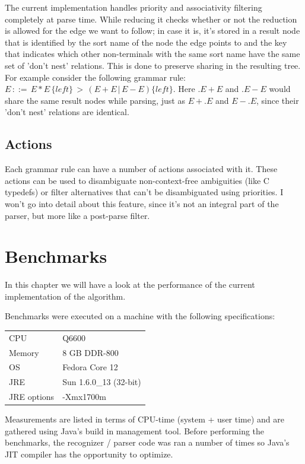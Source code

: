 \documentclass[a4paper,10pt]{article}
\begin{document}
The current implementation handles priority and associativity filtering completely at parse time. While reducing it checks whether or not the reduction is allowed for the edge we want to follow; in case it is, it's stored in a result node that is identified by the sort name of the node the edge points to and the key that indicates which other non-terminals with the same sort name have the same set of 'don't nest' relations. This is done to preserve sharing in the resulting tree. For example consider the following grammar rule: $E\,::=\,E * E\,\{left\}\,>\,(E + E\,|\,E - E)\{left\}$. Here $.E + E$ and $.E - E$ would share the same result nodes while parsing, just as $E+.E$ and $E-.E$, since their 'don't nest' relations are identical.

\subsection{Actions}

Each grammar rule can have a number of actions associated with it. These actions can be used to disambiguate non-context-free ambiguities (like C typedefs) or filter alternatives that can't be disambiguated using priorities. I won't go into detail about this feature, since it's not an integral part of the parser, but more like a post-parse filter.

\section{Benchmarks}

In this chapter we will have a look at the performance of the current implementation of the algorithm.

Benchmarks were executed on a machine with the following specifications:
\begin{table}[H]
\centering
\begin{tabular}{ | p{6em} | p{9em} | }
 \hline
 CPU & Q6600 \\
 Memory & 8 GB DDR-800 \\
 OS & Fedora Core 12 \\
 JRE & Sun 1.6.0\_13 (32-bit) \\
 JRE options & -Xmx1700m \\
 \hline
\end{tabular}
\end{table}

Measurements are listed in terms of CPU-time (system + user time) and are gathered using Java's build in management tool. Before performing the benchmarks, the recognizer / parser code was ran a number of times so Java's JIT compiler has the opportunity to optimize.
\end{document}
